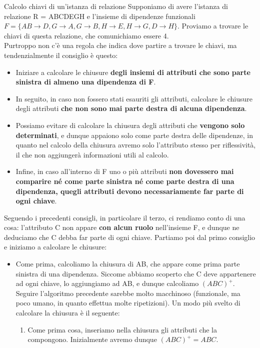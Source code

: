\documentclass[12pt]{report}
\newcommand{\ra}{
	\rightarrow
}
\begin{document}
	\begin{esercizio}{Calcolo chiavi di un'istanza di relazione}{}
		Supponiamo di avere l'istanza di relazione R = ABCDEGH e l'insieme di dipendenze funzionali $F = \{AB \ra D, G \ra A, G \ra B, H \ra E, H \ra G, D \ra H\}$. Proviamo a trovare le chiavi di questa relazione, che comunichiamo essere 4.\\
		Purtroppo non c'è una regola che indica dove partire a trovare le chiavi, ma tendenzialmente il consiglio è questo:
		\begin{itemize}
			\item Iniziare a calcolare le chiusure \textbf{degli insiemi di attributi che sono parte sinistra di almeno una dipendenza di F}.
			
			\item In seguito, in caso non fossero stati esauriti gli attributi, calcolare le chiusure degli attributi \textbf{che non sono mai parte destra di alcuna dipendenza}.
			
			\item Possiamo evitare di calcolare la chiusura degli attributi che \textbf{vengono solo determinati}, e dunque appaiono solo come parte destra delle dipendenze, in quanto nel calcolo della chiusura avremo solo l'attributo stesso per riflessività, il che non aggiungerà informazioni utili al calcolo.
			
			\item Infine, in caso all'interno di F uno o più attributi \textbf{non dovessero mai comparire né come parte sinistra né come parte destra di una dipendenza, quegli attributi devono necessariamente far parte di ogni chiave}.
		\end{itemize}
		
		Seguendo i precedenti consigli, in particolare il terzo, ci rendiamo conto di una cosa: l'attributo C non appare \textbf{con alcun ruolo} nell'insieme F, e dunque ne deduciamo che C debba far parte di ogni chiave. Partiamo poi dal primo consiglio e iniziamo a calcolare le chiusure:
		\begin{itemize}
			\item Come prima, calcoliamo la chiusura di AB, che appare come prima parte sinistra di una dipendenza. Siccome abbiamo scoperto che C deve appartenere ad ogni chiave, lo aggiungiamo ad AB, e dunque calcoliamo $(ABC)^+$. Seguire l'algoritmo precedente sarebbe molto macchinoso (funzionale, ma poco umano, in quanto effettua molte ripetizioni). Un modo più svelto di calcolare la chiusura è il seguente:
			\begin{enumerate}
				\item Come prima cosa, inseriamo nella chiusura gli attributi che la compongono. Inizialmente avremo dunque $(ABC)^+ = ABC$.
				

\end{enumerate}
\end{itemize}
\end{esercizio}
\end{document}
